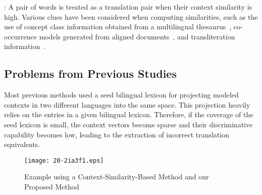 \documentclass[english]{jnlp_1.4}
\begin{document}
: A pair of words is treated as a translation pair when their context similarity is high. Various clues have been considered when computing similarities, such as the use of concept class information obtained from a multilingual thesaurus~\cite{dejean02}, co-occurrence models generated from aligned documents~\cite{prochasson11}, and transliteration information~\cite{shao04}.


\subsection{Problems from Previous Studies}
\label{sect:problem}

Most previous methods used a seed bilingual lexicon for projecting modeled contexts in two different languages into the same space. 
This projection heavily relies on the entries in a given bilingual lexicon. 
Therefore, if the coverage of the seed lexicon is small, the context vectors become sparse and their discriminative capability becomes low, leading to the extraction of incorrect translation equivalents. 

\begin{figure}[b]
\begin{center}
\texttt{[image: 20-2ia3f1.eps]}
\end{center}
\caption{Example using a Context-Similarity-Based Method and our Proposed Method}
\label{fig:example}
\end{figure}
\end{document}

